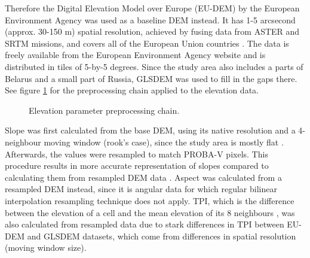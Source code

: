 \documentclass[a4paper,10pt]{book}
\begin{document}
Therefore the Digital Elevation Model over Europe (EU-DEM) by the European Environment Agency was used as a baseline DEM instead. It has 1-5 arcsecond (approx. 30-150 m) spatial resolution, achieved by fusing data from ASTER and SRTM missions, and covers all of the European Union countries \citep{bashfield2011eudem}. The data is freely available from the European Environment Agency website and is distributed in tiles of 5-by-5 degrees. Since the study area also includes a parts of Belarus and a small part of Russia, GLSDEM was used to fill in the gaps there. See figure \ref{fig-elevation-preprocessing} for the preprocessing chain applied to the elevation data.

\begin{figure}
  \centering
  \caption{Elevation parameter preprocessing chain.}
  \label{fig-elevation-preprocessing}
\end{figure}

Slope was first calculated from the base DEM, using its native resolution and a 4-neighbour moving window (rook's case), since the study area is mostly flat \citep{jones1998dem}. Afterwards, the values were resampled to match PROBA-V pixels. This procedure results in more accurate representation of slopes compared to calculating them from resampled DEM data \citep{grohmann2015demresampling, wu2008demresampling}. Aspect was calculated from a resampled DEM instead, since it is angular data for which regular bilinear interpolation resampling technique does not apply. TPI, which is the difference between the elevation of a cell and the mean elevation of its 8 neighbours \citep{weiss2001topographic, wilson2007terrain}, was also calculated from resampled data due to stark differences in TPI between EU-DEM and GLSDEM datasets, which come from differences in spatial resolution (moving window size).
\end{document}
